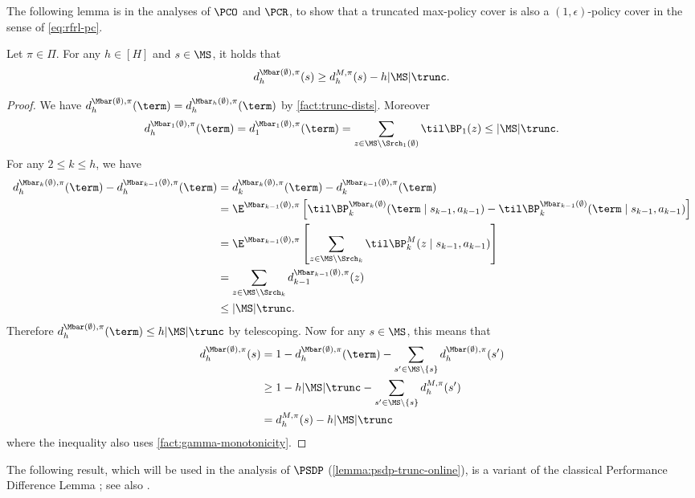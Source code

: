 The following lemma is in the analyses of $\PCO$ and $\PCR$, to show that a truncated max-policy cover is also a $(1,\epsilon)$-policy cover in the sense of \cref{eq:rfrl-pc}.

\begin{lemma}\label{lemma:term-ub}
Let $\pi \in \Pi$. For any $h \in [H]$ and $s \in \MS$, it holds that
\[d^{\Mbar(\emptyset),\pi}_h(s) \geq d^{M,\pi}_h(s) -  h|\MS|\trunc.\]
\end{lemma}

\begin{proof}
We have $d^{\Mbar(\emptyset),\pi}_h(\term) = d^{\Mbar_h(\emptyset),\pi}_h(\term)$ by \cref{fact:trunc-dists}. Moreover \[d^{\Mbar_1(\emptyset),\pi}_h(\term) = d^{\Mbar_1(\emptyset),\pi}_1(\term) = \sum_{z \in \MS \setminus \Srch_1(\emptyset)} \til\BP_1(z) \leq |\MS| \trunc.\] 
For any $2 \leq k \leq h$, we have
\begin{align*}
d^{\Mbar_k(\emptyset),\pi}_h(\term) - d^{\Mbar_{k-1}(\emptyset),\pi}_h(\term) 
&= d^{\Mbar_k(\emptyset),\pi}_k(\term) - d^{\Mbar_{k-1}(\emptyset),\pi}_k(\term) \\ 
&= \E^{\Mbar_{k-1}(\emptyset),\pi}  \left[\til\BP_k^{\Mbar_k(\emptyset)}(\term\mid{}s_{k-1},a_{k-1}) - \til\BP_k^{\Mbar_{k-1}(\emptyset)}(\term\mid{}s_{k-1},a_{k-1})\right] \\ 
&= \E^{\Mbar_{k-1}(\emptyset),\pi}\left[\sum_{z \in \MS \setminus \Srch_k} \til\BP^M_k(z\mid{}s_{k-1},a_{k-1})\right] \\ 
&= \sum_{z \in \MS \setminus \Srch_k} d^{\Mbar_{k-1}(\emptyset),\pi}_{k-1}(z) \\ 
&\leq |\MS|\trunc.
\end{align*}
Therefore $d^{\Mbar(\emptyset),\pi}_h(\term) \leq h|\MS|\trunc$ by telescoping. Now for any $s \in \MS$, this means that
\begin{align*}
d^{\Mbar(\emptyset),\pi}_h(s)
&= 1 - d^{\Mbar(\emptyset),\pi}_h(\term) - \sum_{s' \in \MS \setminus \{s\}} d^{\Mbar(\emptyset),\pi}_h(s') \\ 
&\geq 1 - h|\MS|\trunc - \sum_{s' \in \MS \setminus \{s\}} d^{M,\pi}_h(s') \\ 
&= d^{M,\pi}_h(s) - h|\MS|\trunc
\end{align*}
where the inequality also uses \cref{fact:gamma-monotonicity}.
\end{proof}


The following result, which will be used in the analysis of $\PSDP$ (\cref{lemma:psdp-trunc-online}), is a variant of the classical Performance Difference Lemma \citep{kakade2002approximately}; see also \cite{golowich2024exploring}.

